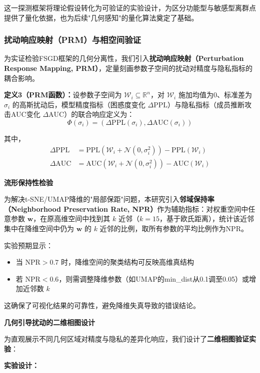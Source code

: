 \documentclass[letterpaper,twocolumn,10pt]{article}
\begin{document}
这一探测框架将理论假设转化为可验证的实验设计，为区分功能型与敏感型离群点提供了量化依据，也为后续"几何感知"的量化算法奠定了基础。

\subsubsection{扰动响应映射（PRM）与相空间验证}

为实证检验FSGD框架的几何分离性，我们引入\textbf{扰动响应映射（Perturbation Response Mapping, PRM）}，定量刻画参数子空间的扰动对精度与隐私指标的耦合影响。

\textbf{定义3（PRM函数）：}设参数子空间为 $\mathcal{W}_i \subseteq \mathbb{R}^n$，对 $\mathcal{W}_i$ 施加均值为0、标准差为 $\sigma_i$ 的高斯扰动后，模型精度指标（困惑度变化 $\Delta \text{PPL}$）与隐私指标（成员推断攻击AUC变化 $\Delta \text{AUC}$）的联合响应定义为：
$$\Phi(\sigma_i) = (\Delta \text{PPL}(\sigma_i), \Delta \text{AUC}(\sigma_i))$$

其中，
\begin{align*}
\Delta \text{PPL} &= \text{PPL}(\mathcal{W}_i + \mathcal{N}(0, \sigma_i^2)) - \text{PPL}(\mathcal{W}_i) \\
\Delta \text{AUC} &= \text{AUC}(\mathcal{W}_i + \mathcal{N}(0, \sigma_i^2)) - \text{AUC}(\mathcal{W}_i)
\end{align*}

\textbf{流形保持性检验}

为解决t-SNE/UMAP降维的"局部保距"问题，本研究引入\textbf{邻域保持率（Neighborhood Preservation Rate, NPR）}作为辅助指标：对权重空间中任意参数 $\mathbf{w}$，在原高维空间中找到其 $k$ 近邻（$k=15$，基于欧氏距离），统计该近邻集中在降维空间中仍为 $\mathbf{w}$ 的 $k$ 近邻的比例，取所有参数的平均比例作为NPR。

实验预期显示：
\begin{itemize}
\item 当 $\text{NPR} > 0.7$ 时，降维空间的聚类结构可反映高维真结构
\item 若 $\text{NPR} < 0.6$，则需调整降维参数（如UMAP的min\_dist从0.1调至0.05）或增加近邻数 $k$
\end{itemize}

这确保了可视化结果的可靠性，避免降维失真导致的错误结论。

\textbf{几何引导扰动的二维相图设计}

为直观展示不同几何区域对精度与隐私的差异化响应，我们设计了\textbf{二维相图验证实验}：

\textbf{实验设计：}
\end{document}
